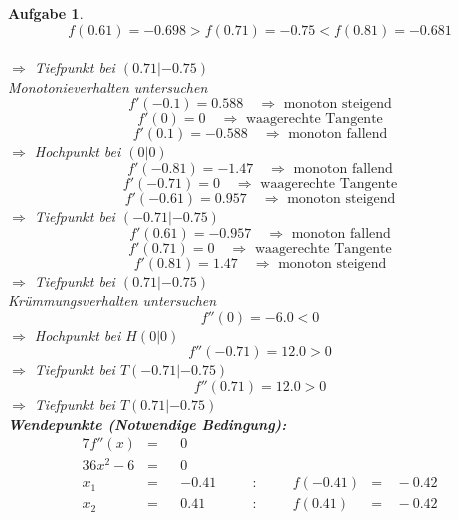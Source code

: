 \documentclass[12pt]{article}
\theoremstyle{note}
\newtheorem{aufgabe}{Aufgabe}
\begin{document}
\begin{flushleft}
\begin{aufgabe}
\vspace{1em}$$f(0.61)=-0.698  >  f(0.71)=-0.75  <   f(0.81)=-0.681$$\\ 
$\Rightarrow$ Tiefpunkt bei $(0.71|-0.75)$ \\ 
\vspace{1em}{\em 2. M\"oglichkeit:} Monotonieverhalten untersuchen \\ 
$$f'(-0.1)=0.588\quad \Rightarrow \text{ monoton steigend} $$$$f'(0)=0 \quad \Rightarrow \text{ waagerechte Tangente} $$$$f'(0.1)=-0.588\quad \Rightarrow \text{ monoton fallend} $$$\Rightarrow$ Hochpunkt bei $(0|0)$ \\ 
\vspace{1em}$$f'(-0.81)=-1.47\quad \Rightarrow \text{ monoton fallend} $$$$f'(-0.71)=0 \quad \Rightarrow \text{ waagerechte Tangente} $$$$f'(-0.61)=0.957\quad \Rightarrow \text{ monoton steigend} $$$\Rightarrow$ Tiefpunkt bei $(-0.71|-0.75)$ \\ 
\vspace{1em}$$f'(0.61)=-0.957\quad \Rightarrow \text{ monoton fallend} $$$$f'(0.71)=0 \quad \Rightarrow \text{ waagerechte Tangente} $$$$f'(0.81)=1.47\quad \Rightarrow \text{ monoton steigend} $$$\Rightarrow$ Tiefpunkt bei $(0.71|-0.75)$ \\ 
\vspace{1em}{\em 3. M\"oglichkeit:} Kr\"ummungsverhalten untersuchen \\ 
$$f''(0)=-6.0< 0 $$ 
$\Rightarrow$ Hochpunkt bei $H(0|0)$ \\ 
$$f''(-0.71)=12.0> 0 $$ 
$\Rightarrow$ Tiefpunkt bei $T(-0.71|-0.75)$ \\ 
$$f''(0.71)=12.0> 0 $$ 
$\Rightarrow$ Tiefpunkt bei $T(0.71|-0.75)$ \\ 
{\bf Wendepunkte (Notwendige Bedingung):} 
\begin{alignat*}{7} 
f''(x)&=& &0& \\ 
36 x^{2} - 6&=& &0& \\ 
x_1&=& &-0.41& \quad &:& \quad &f(-0.41)&=& \,-0.42\\ 
x_2&=& &0.41& \quad &:& \quad &f(0.41)&=& \,-0.42\\ 
\end{alignat*} 


\end{aufgabe}
\end{flushleft}
\end{document}

